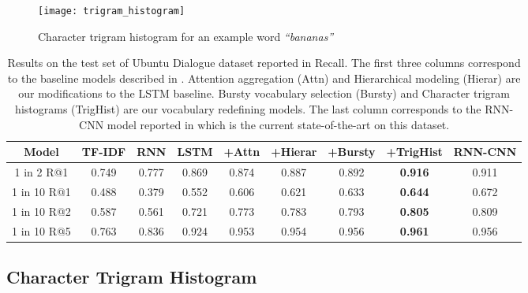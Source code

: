 \documentclass[11pt]{report}
\begin{document}
\begin{figure}
\texttt{[image: trigram\_histogram]}
\caption{Character trigram histogram for an example word \textit{``bananas''}}
\label{fig:trigram_histogram}
\vspace{-1.0em}
\end{figure}

\begin{table}
\begin{tabular}{  c | c | c | c | c | c | c | c | c }
Model & TF-IDF & RNN & LSTM & +Attn & +Hierar & +Bursty & +TrigHist & RNN-CNN \\ \hline
1 in 2 R@1 & 0.749 & 0.777 & 0.869 & 0.874 & 0.887 & 0.892 & \textbf{0.916} & 0.911\\ 
1 in 10 R@1 & 0.488 & 0.379 & 0.552 & 0.606 & 0.621 & 0.633 & \textbf{0.644} & 0.672\\
1 in 10 R@2 & 0.587 & 0.561 & 0.721 & 0.773 & 0.783 & 0.793 & \textbf{0.805} & 0.809\\ 
1 in 10 R@5 & 0.763 & 0.836 & 0.924 & 0.953 & 0.954 & 0.956 & \textbf{0.961} & 0.956 \\ \hline
\end{tabular}
\caption{Results on the test set of Ubuntu Dialogue dataset reported in Recall. The first three columns correspond to the baseline models described in \cite{lowe2015ubuntu}. Attention aggregation (Attn) and Hierarchical modeling (Hierar) are our modifications to the LSTM baseline. Bursty vocabulary selection (Bursty) and Character trigram histograms (TrigHist) are our vocabulary redefining models. The last column corresponds to the RNN-CNN model reported in \cite{baudivs2016sentence} which is the current state-of-the-art on this dataset.}
\label{results}
\end{table}

\subsection{Character Trigram Histogram} \label{character_trigram_histogram}
\end{document}
